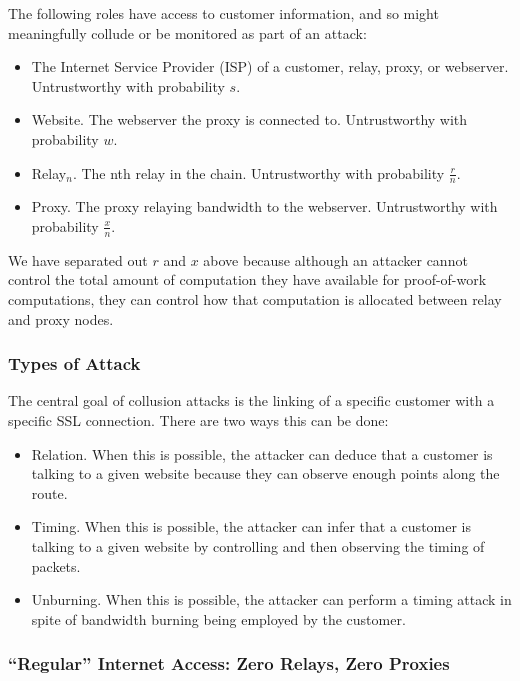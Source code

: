 The following roles have access to customer information, and so might
meaningfully collude or be monitored as part of an attack:

\begin{itemize}
\item The Internet Service Provider (ISP) of a customer, relay, proxy,
  or webserver. Untrustworthy with probability $s$.
\item Website. The webserver the proxy is connected to. Untrustworthy
  with probability $w$.
\item Relay$_n$. The nth relay in the chain. Untrustworthy with
  probability $\frac{r}{n}$.
\item Proxy. The proxy relaying bandwidth to the
  webserver. Untrustworthy with probability $\frac{x}{n}$.
\end{itemize}

We have separated out $r$ and $x$ above because although an attacker
cannot control the total amount of computation they have available for
proof-of-work computations, they can control how that computation is
allocated between relay and proxy nodes.

\subsubsection*{Types of Attack}

The central goal of collusion attacks is the linking of a specific
\Orchid{} customer with a specific SSL connection. There are two ways
this can be done:

\begin{itemize}
\item Relation. When this is possible, the attacker can deduce that a
  customer is talking to a given website because they can observe
  enough points along the route.
\item Timing. When this is possible, the attacker can infer that a
  customer is talking to a given website by controlling and then
  observing the timing of packets.
\item Unburning. When this is possible, the attacker can perform a
  timing attack in spite of bandwidth burning being employed by the
  customer.
\end{itemize}

\subsubsection*{``Regular'' Internet Access: Zero Relays, Zero Proxies}

